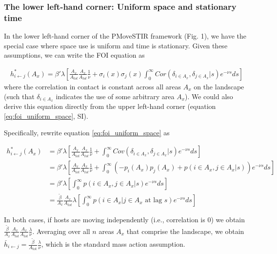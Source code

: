 \documentclass[letterpaper]{article}
\begin{document}
\subsubsection*{The lower left-hand corner: Uniform space and stationary time}

In the lower left-hand corner of the PMoveSTIR framework (Fig. 1), we have the special case where space use is uniform and time is stationary. Given these assumptions, we can write the FOI equation as

\begin{equation}
    \begin{aligned}
        h^*_{i \leftarrow j}(A_x) = \beta' \lambda \left[\frac{A_x}{A_{tot}}\frac{A_x}{A_{tot}} \frac{1}{\nu} + \sigma_i(x) \sigma_j(x) \int_{0}^{\infty} Cor(\delta_{i \in A_x}, \delta_{j \in A_x} | s) e^{-\nu s} ds\right]
    \end{aligned}
    \label{eq:uniform_stationary1}
\end{equation}
where the correlation in contact is constant across all areas $A_x$ on the landscape (such that $\delta_{i \in A_x}$ indicates the use of some arbitrary area $A_x$).  We could also derive this equation directly from the upper left-hand corner (equation \ref{eq:foi_uniform_space}, SI).

Specifically, rewrite equation \ref{eq:foi_uniform_space} as 

\begin{equation}
    \begin{aligned}
        h^*_{i \leftarrow j}(A_x) &= \beta' \lambda [\frac{A_x}{A_{tot}}\frac{A_x}{A_{tot}} \frac{1}{\nu} + \int_{0}^{\infty} Cov(\delta_{i \in A_x}, \delta_{j \in A_x} | s) e^{-\nu s} ds] \\
        &= \beta' \lambda [\frac{A_x}{A_{tot}}\frac{A_x}{A_{tot}} \frac{1}{\nu} + \int_{0}^{\infty} ( - p_i(A_x)p_j(A_x) + p(i \in A_x, j \in A_x | s)) e^{-\nu s} ds] \\
        &= \beta' \lambda [\int_{0}^{\infty} p(i \in A_x, j \in A_x | s) e^{-\nu s} ds] \\
        &= \frac{\tilde{\beta}}{A_x} \frac{A_x}{A_{tot}} \lambda [\int_{0}^{\infty} p(i \in A_x | j \in A_x \text{ at lag } s) e^{-\nu s} ds]
    \end{aligned}
    \label{eq:uniform_stationary2}
\end{equation}

In both cases, if hosts are moving independently (i.e., correlation is 0) we obtain $\frac{\tilde{\beta}}{A_x} \frac{A_x}{A_{tot}} \frac{A_x}{A_{tot}}  \frac{\lambda}{\nu}$. Averaging over all $n$ areas $A_x$ that comprise the landscape, we obtain $\bar{h}_{i \leftarrow j} =\frac{\tilde{\beta}}{A_\text{tot}} \frac{\lambda}{\nu}$, which is the standard mass action assumption.
\end{document}
